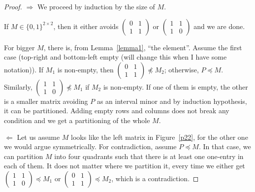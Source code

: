\documentclass[12pt,a4paper]{report}
\begin{document}
\begin{proof}
\item[$\Rightarrow$] We proceed by induction by the size of $M$.

If $M\in\{0,1\}^{2\times2}$, then it either avoids $\left(\begin{smallmatrix}0&1\\1&1\end{smallmatrix}\right)$ or $\left(\begin{smallmatrix}1&1\\1&0\end{smallmatrix}\right)$ and we are done.

For bigger $M$, there is, from Lemma~\ref{lemma1}, ``the element''. Assume the first case (top-right and bottom-left empty (will change this when I have some notation)). If $M_1$ is non-empty, then $\left(\begin{smallmatrix}0&1\\1&1\end{smallmatrix}\right)\not\preceq M_2$; otherwise, $P\preceq M$. Similarly, $\left(\begin{smallmatrix}1&1\\1&0\end{smallmatrix}\right)\not\preceq M_1$ if $M_2$ is non-empty. If one of them is empty, the other is a smaller matrix avoiding $P$ as an interval minor and by induction hypothesis, it can be partitioned. Adding empty rows and columns does not break any condition and we get a partitioning of the whole $M$.
\item[$\Leftarrow$] Let us assume $M$ looks like the left matrix in Figure~\ref{p22}, for the other one we would argue symmetrically. For contradiction, assume $P\preceq M$. In that case, we can partition $M$ into four quadrants such that there is at least one one-entry in each of them. It does not matter where we partition it, every time we either get $\left(\begin{smallmatrix}1&1\\1&0\end{smallmatrix}\right)\preceq M_1$ or $\left(\begin{smallmatrix}0&1\\1&1\end{smallmatrix}\right)\preceq M_2$, which is a contradiction.
\end{proof}
\end{document}
